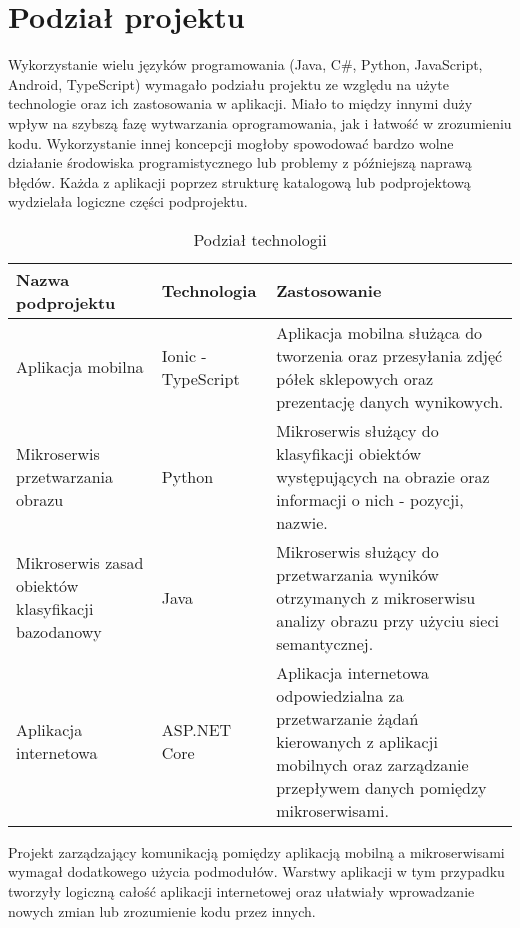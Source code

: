 \section{Podział projektu}
{Wykorzystanie wielu języków programowania (Java, C\#, Python, JavaScript, Android, TypeScript) wymagało podziału projektu ze względu na użyte technologie oraz ich zastosowania w aplikacji. Miało to między innymi duży wpływ na szybszą fazę wytwarzania oprogramowania, jak i łatwość w zrozumieniu kodu. Wykorzystanie innej koncepcji mogłoby spowodować bardzo wolne działanie środowiska programistycznego lub problemy z późniejszą naprawą błędów. Każda z aplikacji poprzez strukturę katalogową lub podprojektową wydzielała logiczne części podprojektu.	
		\begin{table}[htbp]
		\caption{Podział technologii}
		\label{sys-architecture}
		\begin{center}
			\begin{tabular}{ | p{4cm}| p{3cm} | p{6cm} |}
				\hline Nazwa podprojektu & Technologia &  Zastosowanie \\ \hline   
				\hline  Aplikacja mobilna &  Ionic - TypeScript & Aplikacja mobilna służąca do tworzenia oraz przesyłania zdjęć półek sklepowych oraz prezentację danych wynikowych.\\ \hline
				
				\hline  Mikroserwis przetwarzania obrazu & Python & Mikroserwis służący do klasyfikacji obiektów występujących na obrazie oraz informacji o nich - pozycji, nazwie.\\ \hline
				
				\hline Mikroserwis zasad obiektów klasyfikacji  \mbox{bazodanowy} & Java & Mikroserwis służący do przetwarzania wyników otrzymanych z mikroserwisu analizy obrazu przy użyciu sieci semantycznej.\\ \hline
				
				\hline Aplikacja internetowa & ASP.NET Core & Aplikacja internetowa odpowiedzialna za przetwarzanie żądań kierowanych z aplikacji mobilnych oraz zarządzanie przepływem danych pomiędzy mikroserwisami.\\ \hline
			\end{tabular}
		\end{center}
	\end{table}	
	
	
Projekt zarządzający komunikacją pomiędzy aplikacją mobilną a mikroserwisami wymagał dodatkowego użycia podmodułów. Warstwy aplikacji w tym przypadku tworzyły logiczną całość aplikacji internetowej oraz ułatwiały wprowadzanie nowych zmian lub zrozumienie kodu przez innych.


}
